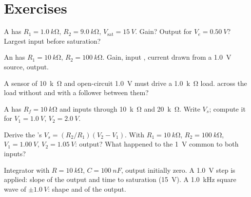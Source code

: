 \section{Exercises}

\begin{exercise}[$\star$]\label{exo:b1:operational-amplifier:1}
A  has $R_1 = \qty{1.0}{k\ohm}$, $R_2 =
\qty{9.0}{k\ohm}$, $V_{\mathrm{sat}} = \qty{15}{V}$. Gain? Output for
$V_e = \qty{0.50}{V}$? Largest input before saturation?
\end{exercise}

\begin{exercise}[$\star$]\label{exo:b1:operational-amplifier:2}
An  has $R_1 = \qty{10}{k\ohm}$, $R_2 = \qty{100}{k\ohm}$.
Gain, input , current drawn from a \qty{1.0}{V} source, output.
\end{exercise}

\begin{exercise}[$\star$]\label{exo:b1:operational-amplifier:3}
A sensor of  \qty{10}{k\ohm} and open-circuit
 \qty{1.0}{V} must drive a \qty{1.0}{k\ohm} load.  across
the load without and with a follower between them?
\end{exercise}

\begin{exercise}[$\star$]\label{exo:b1:operational-amplifier:4}
A  has $R_f = \qty{10}{k\ohm}$ and inputs through
\qty{10}{k\ohm} and \qty{20}{k\ohm}. Write $V_s$; compute it for
$V_1 = \qty{1.0}{V}$, $V_2 = \qty{2.0}{V}$.
\end{exercise}

\begin{exercise}[$\star\star$]\label{exo:b1:operational-amplifier:5}
Derive the 's $V_s = (R_2/R_1)(V_2 - V_1)$. With
$R_1 = \qty{10}{k\ohm}$, $R_2 = \qty{100}{k\ohm}$, $V_1 = \qty{1.00}{V}$,
$V_2 = \qty{1.05}{V}$: output? What happened to the \qty{1}{V} common
to both inputs?
\end{exercise}

\begin{exercise}[$\star\star$]\label{exo:b1:operational-amplifier:6}
Integrator with $R = \qty{10}{k\ohm}$, $C = \qty{100}{nF}$, output
initially zero. A \qty{1.0}{V} step is applied: slope of the output and
time to saturation (\qty{15}{V}). A \qty{1.0}{kHz} square wave of
$\pm\qty{1.0}{V}$: shape and  of the output.
\end{exercise}


